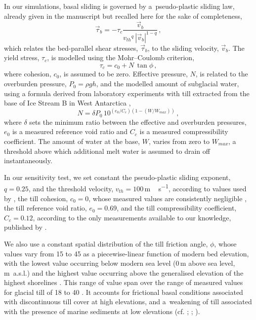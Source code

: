 \clearpage  %

In our simulations, basal sliding is governed by a~pseudo-plastic sliding law,
already given in the manuscript but recalled here for the sake of completeness,
%
\begin{equation}
    \label{eqn:pseudoplastic}
    \vec{\tau}_b = -\tau_c \frac{\vec{v}_b}{{v_{th}}^q\,|\vec{v}_b|^{1-q}} \,,
\end{equation}
%
which relates the bed-parallel shear stresses, $\vec{\tau}_b$, to the sliding
velocity, $\vec{v}_b$. The yield stress, $\tau_c$, is modelled using the
Mohr--Coulomb criterion,
%
\begin{equation}
   \tau_c = c_0 + N\,\tan{\phi} \,,
\end{equation}
%
where cohesion, $c_0$, is assumed to be zero. Effective pressure, $N$, is
related to the overburden pressure, $P_0=\rho gh$, and the modelled amount of
subglacial water, using a formula derived from laboratory experiments with till
extracted from the base of Ice Stream B in West Antarctica
\citep[Eqn.~23]{Tulaczyk.etal.2000, Bueler.Pelt.2015},
\begin{equation}
    \label{eqn:ntil}
    N = \delta P_0 \, 10^{(e_0/C_c) (1 - (W/W_{max}))} \,,
\end{equation}
where $\delta$ sets the minimum ratio between the effective and
overburden pressures, $e_0$ is a measured reference void ratio
and $C_c$ is a measured compressibility coefficient. The amount of water at the
base, $W$, varies from zero to $W_{max}$, a threshold above which additional
melt water is assumed to drain off instantaneously.

In our sensitivity test, we set constant the pseudo-plastic sliding exponent,
$q=0.25$, and the threshold velocity, $v_{th}=100$\,\unit{m\,s^{-1}}, according
to values used by \citet{Aschwanden.etal.2013}, the till cohesion, $c_0=0$,
whose measured values are consistently negligible
\citep[p.~268]{Tulaczyk.etal.2000, Cuffey.Paterson.2010}, the till reference
void ratio, $e_0=0.69$, and the till compressibility coefficient, $C_c=0.12$,
according to the only measurements available to our knowledge, published by
\citep{Tulaczyk.etal.2000}.

We also use a constant spatial distribution of the till friction angle, $\phi$,
whose values vary from 15 to 45{\degree} as a piecewise-linear function of
modern bed elevation, with the lowest value occurring below modern sea level
(0\,m above sea level, m~a.s.l.) and the highest value occurring above the
generalised elevation of the highest shorelines
\citep[200\,m~a.s.l.,][Fig.~5]{Clague.1981}. This range of value span over the
range of measured values for glacial till of 18 to 40{\degree}
\citep[p.~268]{Cuffey.Paterson.2010}. It accounts for frictional basal
conditions associated with discontinuous till cover at high elevations, and
a~weakening of till associated with the presence of marine sediments at low
elevations (cf. \citealp{Martin.etal.2011};
\citealp[supplement]{Aschwanden.etal.2013}; \citealp{PISM-authors.2015}).

